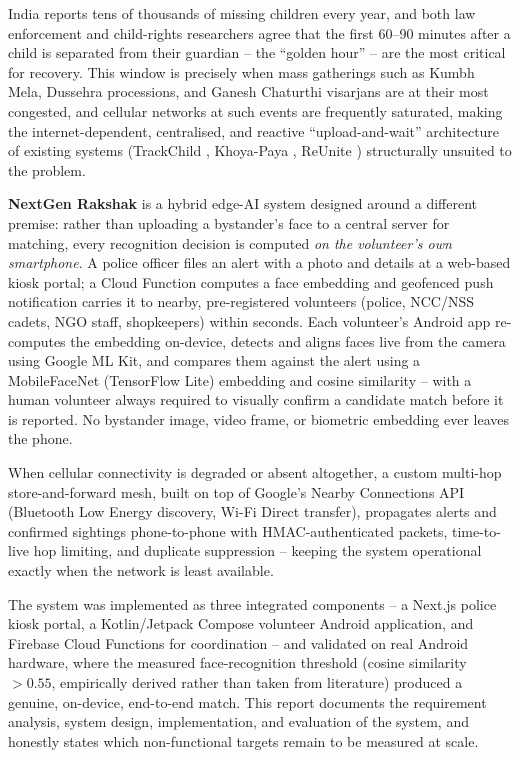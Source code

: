 \documentclass[12pt,a4paper,oneside]{report}
\begin{document}
India reports tens of thousands of missing children every year, and both law
enforcement and child-rights researchers agree that the first 60--90 minutes
after a child is separated from their guardian -- the ``golden hour'' -- are
the most critical for recovery. This window is precisely when mass
gatherings such as Kumbh Mela, Dussehra processions, and Ganesh Chaturthi
visarjans are at their most congested, and cellular networks at such events
are frequently saturated, making the internet-dependent, centralised, and
reactive ``upload-and-wait'' architecture of existing systems (TrackChild
\cite{trackchild}, Khoya-Paya \cite{khoyapaya}, ReUnite \cite{reunite})
structurally unsuited to the problem.

\textbf{NextGen Rakshak} is a hybrid edge-AI system designed around a
different premise: rather than uploading a bystander's face to a central
server for matching, every recognition decision is computed \emph{on the
volunteer's own smartphone}. A police officer files an alert with a photo and
details at a web-based kiosk portal; a Cloud Function computes a face
embedding and geofenced push notification carries it to nearby, pre-registered
volunteers (police, NCC/NSS cadets, NGO staff, shopkeepers) within seconds.
Each volunteer's Android app re-computes the embedding on-device, detects and
aligns faces live from the camera using Google ML Kit, and compares them
against the alert using a MobileFaceNet (TensorFlow Lite) embedding and
cosine similarity -- with a human volunteer always required to visually
confirm a candidate match before it is reported. No bystander image, video
frame, or biometric embedding ever leaves the phone.

When cellular connectivity is degraded or absent altogether, a custom
multi-hop store-and-forward mesh, built on top of Google's Nearby Connections
API (Bluetooth Low Energy discovery, Wi-Fi Direct transfer), propagates
alerts and confirmed sightings phone-to-phone with HMAC-authenticated
packets, time-to-live hop limiting, and duplicate suppression -- keeping the
system operational exactly when the network is least available.

The system was implemented as three integrated components -- a Next.js
police kiosk portal, a Kotlin/Jetpack Compose volunteer Android application,
and Firebase Cloud Functions for coordination -- and validated on real
Android hardware, where the measured face-recognition threshold (cosine
similarity $>0.55$, empirically derived rather than taken from literature)
produced a genuine, on-device, end-to-end match. This report documents the
requirement analysis, system design, implementation, and evaluation of the
system, and honestly states which non-functional targets remain to be
measured at scale.
\end{document}
